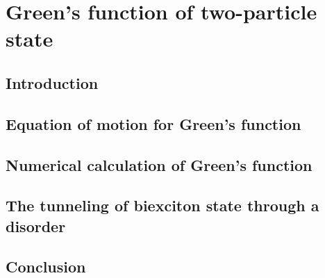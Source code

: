 \chapter{Green's function of two-particle state}
\label{ch:greenfunc}

\section{Introduction}
\label{sec:introGreenFunc}

\section{Equation of motion for Green's function}
\label{sec:equationOfMotion}

\section{Numerical calculation of Green's function}
\label{sec:numericGreen}

\section{The tunneling of biexciton state through a disorder}
\label{sec:biexcitonTunneling}

\section{Conclusion}
\label{sec:conclusionGreenFunc}
